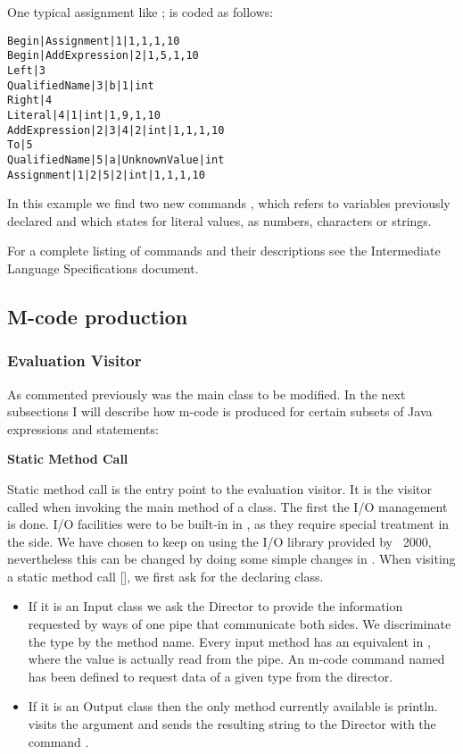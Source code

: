 One typical assignment like ; is coded as follows:
\begin{verbatim}
Begin|Assignment|1|1,1,1,10
Begin|AddExpression|2|1,5,1,10
Left|3
QualifiedName|3|b|1|int
Right|4
Literal|4|1|int|1,9,1,10
AddExpression|2|3|4|2|int|1,1,1,10
To|5
QualifiedName|5|a|UnknownValue|int
Assignment|1|2|5|2|int|1,1,1,10
\end{verbatim}

In this example we find two new commands ,
which refers to variables previously declared and  which states
for literal values, as numbers, characters or strings.

For a complete listing of commands and their descriptions see the
Intermediate Language Specifications document.

\subsection{M-code production}

\subsubsection{Evaluation Visitor}

As commented previously  was the main class to be
modified. In the next subsections I will describe how m-code is produced
for certain subsets of Java expressions and statements:

{\bf{Static Method Call}}

Static method call is the entry point to the evaluation visitor.
It is the visitor called when invoking the main method of a class.
The first the I/O management is done. I/O facilities were to be
built-in in \djava{}, as they require special treatment in the \jel{}
side. We have chosen to keep on using the I/O library provided by
\jel{}~2000, nevertheless this can be changed by doing some simple
changes in . When visiting a static method call
[], we first ask for the
declaring class.

\begin{itemize}
\item If it is an Input class we ask the Director to provide the
information requested by ways of one pipe that communicate both sides.
We discriminate the type by the method name. Every input method has an
equivalent in , where the value is actually read from the
pipe. An m-code command named  has been defined to request data of
a given type from the director.
\item If it is an Output class then the only method currently available
is println. \djava{} visits the argument and sends the resulting
string to the Director with the command .
\end{itemize}

